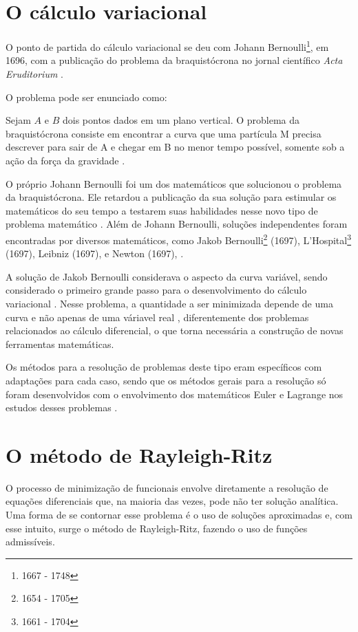 \documentclass[
	12pt,				%
	openright,			%
    twoside,			%
	a4paper,			%
	chapter=TITLE,		%
	english,			%
	french,				%
	spanish,			%
	brazil				%
	]{abntex2}
\numberwithin{lema}{chapter}
\numberwithin{teorema}{chapter}
\numberwithin{definicao}{chapter}
\numberwithin{exemplo}{chapter}
\numberwithin{figure}{chapter}
\newcommand{\bdDate}[2]{\footnote{\gtrsymBorn\text{ }#1 - \gtrsymDied\text{ }#2}}
\begin{document}
\section{O cálculo variacional}

O ponto de partida do cálculo variacional se deu com Johann Bernoulli\bdDate{1667}{1748}, em 1696, com a publicação do problema da braquistócrona no jornal científico \textit{Acta Eruditorium} \cite{hist_courant}.

O problema pode ser enunciado como:
\begin{citacao}
Sejam $A$ e $B$ dois pontos dados em um plano vertical. O problema da braquistócrona consiste em encontrar a curva que uma partícula M precisa descrever para sair de A e chegar em B no menor tempo possível, somente sob a ação da força da gravidade \cite[p. 3]{calcvar}.
\end{citacao}

O próprio Johann Bernoulli foi um dos matemáticos que solucionou o problema da braquistócrona. Ele retardou a publicação da sua solução para estimular os matemáticos do seu tempo a testarem suas habilidades nesse novo tipo de problema matemático \cite{hist_courant}. Além de Johann Bernoulli, soluções independentes foram encontradas por diversos matemáticos, como Jakob Bernoulli\bdDate{1654}{1705} (1697), L'Hospital\bdDate{1661}{1704} (1697), Leibniz (1697), e Newton (1697), \cite{hist_still}.

A solução de Jakob Bernoulli considerava o aspecto da curva variável, sendo considerado o primeiro grande passo para o desenvolvimento do cálculo variacional \cite{hist_still}. Nesse problema, a quantidade a ser minimizada depende de uma curva e não apenas de uma váriavel real \cite{hist_courant}, diferentemente dos problemas relacionados ao cálculo diferencial, o que torna necessária a construção de novas ferramentas matemáticas. 

Os métodos para a resolução de problemas deste tipo eram específicos com adaptações para cada caso, sendo que os métodos gerais para a resolução só foram desenvolvidos com o envolvimento dos matemáticos Euler e Lagrange nos estudos desses problemas \cite{hist_courant}.

\section{O método de Rayleigh-Ritz}

O processo de minimização de funcionais envolve diretamente a resolução de equações diferenciais que, na maioria das vezes, pode não ter solução analítica. Uma forma de se contornar esse problema é o uso de soluções aproximadas e, com esse intuito, surge o método de Rayleigh-Ritz, fazendo o uso de funções admissíveis.
\end{document}
